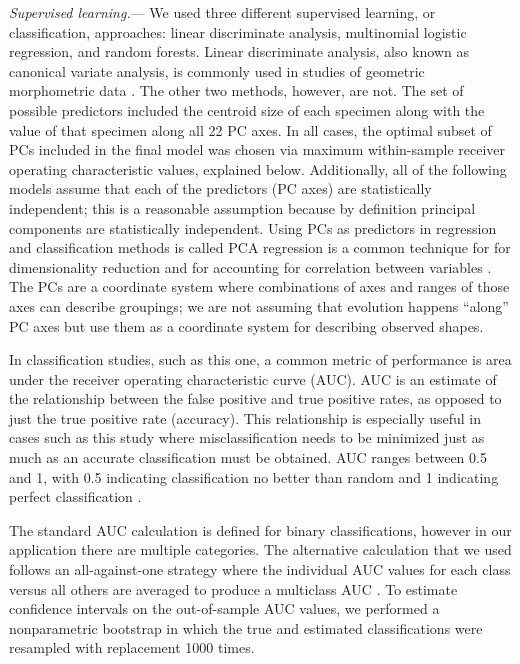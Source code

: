 \documentclass[12pt,letterpaper]{article}
\renewcommand{\subsubsection}[1]{%
\vspace{2ex}
\noindent
\textit{#1.}---}
\begin{document}
\subsubsection{Supervised learning}
We used three different supervised learning, or classification, approaches: linear discriminate analysis, multinomial logistic regression, and random forests. Linear discriminate analysis, also known as canonical variate analysis, is commonly used in studies of geometric morphometric data \citep{Zelditch2004,Claude2008,Mitteroecker2011}. The other two methods, however, are not. The set of possible predictors included the centroid size of each specimen along with the value of that specimen along all 22 PC axes. In all cases, the optimal subset of PCs included in the final model was chosen via maximum within-sample receiver operating characteristic values, explained below. Additionally, all of the following models assume that each of the predictors (PC axes) are statistically independent; this is a reasonable assumption because by definition principal components are statistically independent. Using PCs as predictors in regression and classification methods is called PCA regression is a common technique for for dimensionality reduction and for accounting for correlation between variables \citep{Hastie2009}. The PCs are a coordinate system where combinations of axes and ranges of those axes can describe groupings; we are not assuming that evolution happens ``along'' PC axes \citep{Uyeda2015} but use them as a coordinate system for describing observed shapes.

In classification studies, such as this one, a common metric of performance is area under the receiver operating characteristic curve (AUC). AUC is an estimate of the relationship between the false positive and true positive rates, as opposed to just the true positive rate (accuracy). This relationship is especially useful in cases such as this study where misclassification needs to be minimized just as much as an accurate classification must be obtained. AUC ranges between 0.5 and 1, with 0.5 indicating classification no better than random and 1 indicating perfect classification \citep{Hastie2009}.

The standard AUC calculation is defined for binary classifications, however in our application there are multiple categories. The alternative calculation that we used follows an all-against-one strategy where the individual AUC values for each class versus all others are averaged to produce a multiclass AUC \citep{Hand2001}. To estimate confidence intervals on the out-of-sample AUC values, we performed a nonparametric bootstrap in which the true and estimated classifications were resampled with replacement 1000 times.
\end{document}
